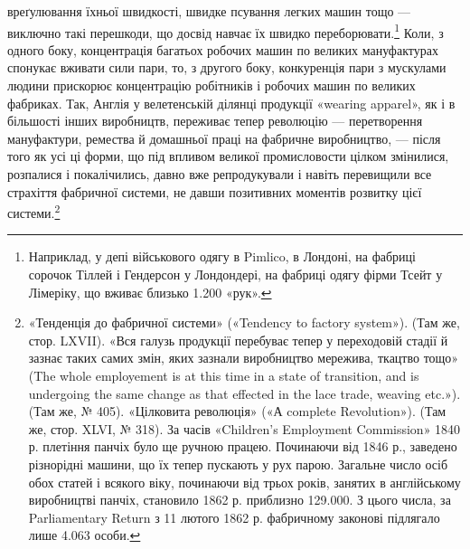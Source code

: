 \parcont{}  %
вреґулювання їхньої швидкості, швидке псування легких машин
тощо — виключно такі перешкоди, що досвід навчає їх швидко
переборювати.\footnote{
Наприклад, у депі військового одягу в Pimlico, в Лондоні, на
фабриці сорочок Тіллей і Гендерсон у Лондондері, на фабриці одягу фірми
Тсейт у Лімеріку, що вживає близько \num{1.200} «рук».
} Коли, з одного боку, концентрація багатьох
робочих машин по великих мануфактурах спонукає вживати сили
пари, то, з другого боку, конкуренція пари з мускулами людини
прискорює концентрацію робітників і робочих машин по великих
фабриках. Так, Англія у велетенській ділянці продукції «wearing
apparel», як і в більшості інших виробництв, переживає тепер
революцію — перетворення мануфактури, ремества й домашньої
праці на фабричне виробництво, — після того як усі ці форми,
що під впливом великої промисловости цілком змінилися,
розпалися і покалічились, давно вже репродукували і навіть
перевищили все страхіття фабричної системи, не давши позитивних
моментів розвитку цієї системи.\footnote{
«Тенденція до фабричної системи» («Tendency to factory system»).
(Там же, стор. LXVII). «Вся галузь продукції перебуває тепер у переходовій
стадії й зазнає таких самих змін, яких зазнали виробництво мережива,
ткацтво тощо» (The whole employement is at this time in a state
of transition, and is undergoing the same change as that effected in the
lace trade, weaving etc.»). (Там же, № 405). «Цілковита революція» («А
complete Revolution»). (Там же, стор. XLVI, № 318). За часів «Children’s
Employment Commission» 1840 р. плетіння панчіх було ще ручною
працею. Починаючи від 1846 р., заведено різнорідні машини, що їх тепер
пускають у рух парою. Загальне число осіб обох статей і всякого
віку, починаючи від трьох років, занятих в англійському виробництві
панчіх, становило 1862 р. приблизно \num{129.000}. З цього числа, за Parliamentary
Return з 11 лютого 1862 р. фабричному законові підлягало
лише \num{4.063} особи.
}

